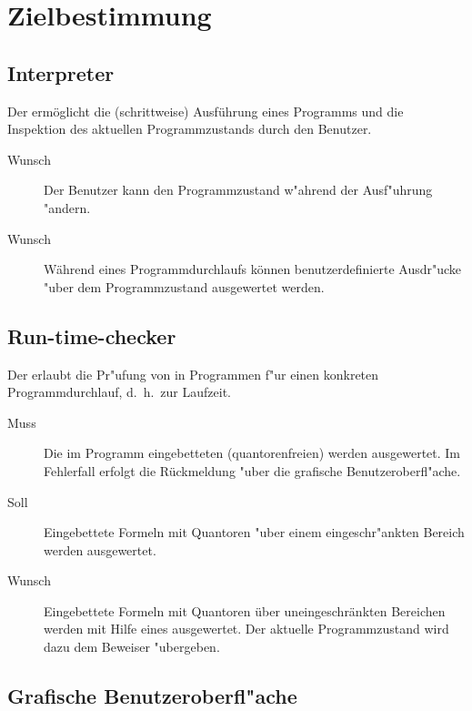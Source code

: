 \section{Zielbestimmung}%


\subsection{Interpreter}%

Der  ermöglicht die (schrittweise) Ausführung eines Programms und die Inspektion des aktuellen Programmzustands durch den Benutzer.%

\begin{description}%
    \item[Wunsch] Der Benutzer kann den Programmzustand w"ahrend der Ausf"uhrung "andern.%
    \item[Wunsch] Während eines Programmdurchlaufs können benutzerdefinierte Ausdr"ucke "uber dem Programmzustand ausgewertet werden.%
\end{description}%

\subsection{Run-time-checker}%

Der  erlaubt die Pr"ufung von  in Programmen f"ur einen konkreten Programmdurchlauf, d.~h.\ zur Laufzeit.%

\begin{description}%
    \item [Muss] Die im Programm eingebetteten (quantorenfreien)  werden ausgewertet. Im Fehlerfall erfolgt die Rückmeldung "uber die grafische Benutzeroberfl"ache.
    \item [Soll] Eingebettete Formeln mit Quantoren "uber einem eingeschr"ankten Bereich werden ausgewertet.%
    \item [Wunsch] Eingebettete Formeln mit Quantoren über uneingeschränkten Bereichen werden mit Hilfe eines  ausgewertet. Der aktuelle Programmzustand wird dazu dem Beweiser "ubergeben.
\end{description}%

\subsection{Grafische Benutzeroberfl"ache}%

